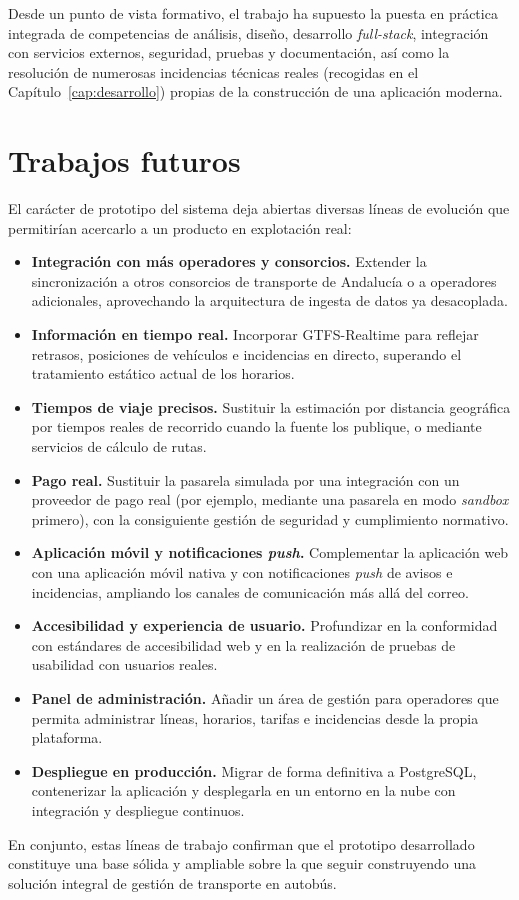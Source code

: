 Desde un punto de vista formativo, el trabajo ha supuesto la puesta en práctica integrada de competencias de análisis, diseño, desarrollo \textit{full-stack}, integración con servicios externos, seguridad, pruebas y documentación, así como la resolución de numerosas incidencias técnicas reales (recogidas en el Capítulo~\ref{cap:desarrollo}) propias de la construcción de una aplicación moderna.


\section{Trabajos futuros}
\label{sec:trabajos-futuros}

El carácter de prototipo del sistema deja abiertas diversas líneas de evolución que permitirían acercarlo a un producto en explotación real:

\begin{itemize}
  \item \textbf{Integración con más operadores y consorcios.} Extender la sincronización a otros consorcios de transporte de Andalucía o a operadores adicionales, aprovechando la arquitectura de ingesta de datos ya desacoplada.
  \item \textbf{Información en tiempo real.} Incorporar GTFS-Realtime para reflejar retrasos, posiciones de vehículos e incidencias en directo, superando el tratamiento estático actual de los horarios.
  \item \textbf{Tiempos de viaje precisos.} Sustituir la estimación por distancia geográfica por tiempos reales de recorrido cuando la fuente los publique, o mediante servicios de cálculo de rutas.
  \item \textbf{Pago real.} Sustituir la pasarela simulada por una integración con un proveedor de pago real (por ejemplo, mediante una pasarela en modo \textit{sandbox} primero), con la consiguiente gestión de seguridad y cumplimiento normativo.
  \item \textbf{Aplicación móvil y notificaciones \textit{push}.} Complementar la aplicación web con una aplicación móvil nativa y con notificaciones \textit{push} de avisos e incidencias, ampliando los canales de comunicación más allá del correo.
  \item \textbf{Accesibilidad y experiencia de usuario.} Profundizar en la conformidad con estándares de accesibilidad web y en la realización de pruebas de usabilidad con usuarios reales.
  \item \textbf{Panel de administración.} Añadir un área de gestión para operadores que permita administrar líneas, horarios, tarifas e incidencias desde la propia plataforma.
  \item \textbf{Despliegue en producción.} Migrar de forma definitiva a PostgreSQL, contenerizar la aplicación y desplegarla en un entorno en la nube con integración y despliegue continuos.
\end{itemize}

En conjunto, estas líneas de trabajo confirman que el prototipo desarrollado constituye una base sólida y ampliable sobre la que seguir construyendo una solución integral de gestión de transporte en autobús.

